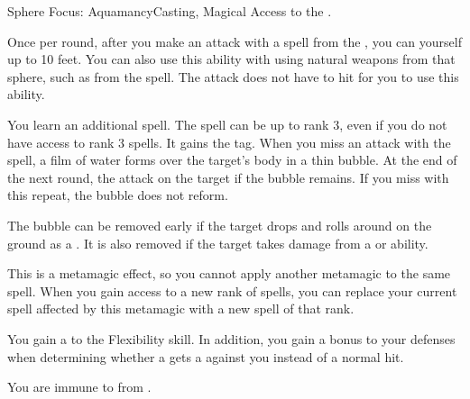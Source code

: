   \begin{magicalfeat}{Sphere Focus: Aquamancy}{Casting, Magical}
    \featpre Access to the  .

     Once per round, after you make an attack with a spell from the  , you can  yourself up to 10 feet.
    You can also use this ability with  using natural weapons from that sphere, such as from the  spell.
    The attack does not have to hit for you to use this ability.

     You learn an additional spell.
    The spell can be up to rank 3, even if you do not have access to rank 3 spells.
    It gains the \atWater tag.
    When you miss an attack with the spell, a film of water forms over the target's body in a thin bubble.
    At the end of the next round, the attack  on the target if the bubble remains.
    If you miss with this repeat, the bubble does not reform.

    The bubble can be removed early if the target drops \prone and rolls around on the ground as a .
    It is also removed if the target takes damage from a \atCold or \atFire ability.

    This is a metamagic effect, so you cannot apply another metamagic to the same spell.
    When you gain access to a new rank of spells, you can replace your current spell affected by this metamagic with a new spell of that rank.

     You gain a   to the Flexibility skill.
    In addition, you gain a  bonus to your defenses when determining whether a  gets a  against you instead of a normal hit.

     You are immune to  from .
  \end{magicalfeat}


